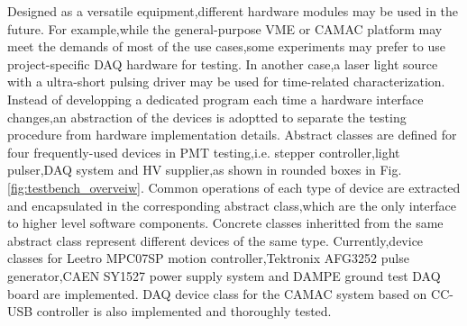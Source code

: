 \documentclass[preprint,5p,times]{elsarticle}
\begin{document}
Designed as a versatile equipment,different hardware modules may be used in the future.
For example,while the general-purpose VME or CAMAC platform may meet the demands of most of the use cases,some experiments may prefer to use project-specific DAQ hardware for testing.
In another case,a laser light source with a ultra-short pulsing driver may be used for time-related characterization.
Instead of developping a dedicated program each time a hardware interface changes,an abstraction of the devices is adoptted to separate the testing procedure from hardware implementation details.
Abstract classes are defined for four frequently-used devices in PMT testing,i.e. stepper controller,light pulser,DAQ system and HV supplier,as shown in rounded boxes in Fig.\ref{fig:testbench_overveiw}.
Common operations of each type of device are extracted and encapsulated in the corresponding abstract class,which are the only interface to higher level software components.
Concrete classes inheritted from the same abstract class represent different devices of the same type.
Currently,device classes for Leetro MPC07SP motion controller,Tektronix AFG3252 pulse generator,CAEN SY1527 power supply system and DAMPE ground test DAQ board are implemented.
DAQ device class for the CAMAC system based on CC-USB controller is also implemented and thoroughly tested.
\end{document}
